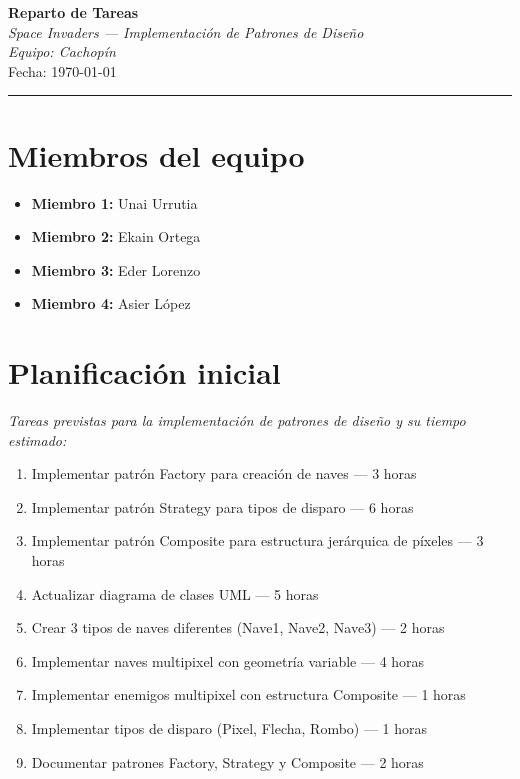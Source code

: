 \documentclass[12pt, a4paper]{article}
\begin{document}
\begin{center}
    {\LARGE \textbf{Reparto de Tareas}}\\[0.4em]
    {\large \textit{Space Invaders — Implementación de Patrones de Diseño}}\\[0.3em]
    {\small \textit{Equipo: Cachopín}}\\[0.2em]
    {\small Fecha: \today}
\end{center}

\vspace{1em}
\hrule
\vspace{1.5em}

\section{Miembros del equipo}

\begin{itemize}[leftmargin=2em]
    \item \textbf{Miembro 1:} Unai Urrutia
    \item \textbf{Miembro 2:} Ekain Ortega
    \item \textbf{Miembro 3:} Eder Lorenzo
    \item \textbf{Miembro 4:} Asier López
\end{itemize}

\vspace{1.5em}

\section{Planificación inicial}

\textit{Tareas previstas para la implementación de patrones de diseño y su tiempo estimado:}

\begin{enumerate}[leftmargin=2em]
    \item Implementar patrón Factory para creación de naves — 3 horas
    \item Implementar patrón Strategy para tipos de disparo — 6 horas
    \item Implementar patrón Composite para estructura jerárquica de píxeles — 3 horas
    \item Actualizar diagrama de clases UML — 5 horas
    \item Crear 3 tipos de naves diferentes (Nave1, Nave2, Nave3) — 2 horas
    \item Implementar naves multipixel con geometría variable — 4 horas
    \item Implementar enemigos multipixel con estructura Composite — 1 horas
    \item Implementar tipos de disparo (Pixel, Flecha, Rombo) — 1 horas
    \item Documentar patrones Factory, Strategy y Composite — 2 horas
\end{enumerate}
\end{document}
